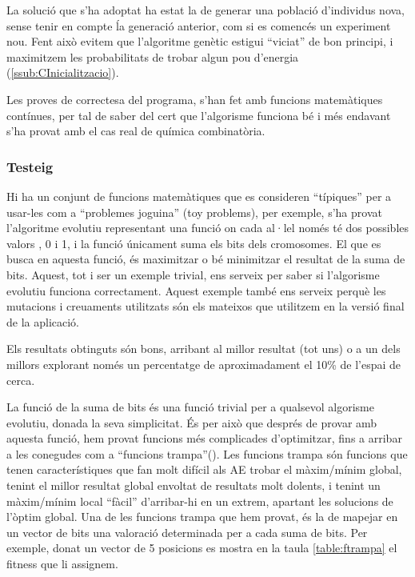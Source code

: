 La solució que s'ha adoptat ha estat la de generar una població d'individus
nova, sense tenir en compte ĺa generació anterior, com si es comencés un
experiment nou.  Fent això evitem que l'algoritme genètic estigui ``viciat'' de
bon principi, i maximitzem les probabilitats de trobar algun pou d'energia
(\ref{ssub:CInicialitzacio}).

Les proves de correctesa del programa, s'han fet amb funcions matemàtiques
contínues, per tal de saber del cert que l'algorisme funciona bé i més endavant
s'ha provat amb el cas real de química combinatòria.


\subsubsection{Testeig} %
\label{ssub:Testeig}

Hi ha un conjunt de funcions matemàtiques que es consideren ``típiques'' per a
usar-les com a ``problemes joguina'' (toy problems), per exemple, s'ha provat
l'algoritme evolutiu representant una funció on cada al·lel només té dos
possibles valors , 0 i 1, i la funció únicament suma els bits dels cromosomes.
El que es busca en aquesta funció, és maximitzar o bé minimitzar el resultat de
la suma de bits.  Aquest, tot i ser un exemple trivial, ens serveix per
saber si l'algorisme evolutiu funciona correctament.  Aquest exemple també ens
serveix perquè les mutacions i creuaments utilitzats són els mateixos que
utilitzem en la versió final de la aplicació.

Els resultats obtinguts són bons, arribant al millor resultat (tot uns) o a un
dels millors explorant només un percentatge de aproximadament el  10\% de
l'espai de cerca.

La funció de la suma de bits és una funció trivial per a qualsevol algorisme
evolutiu, donada la seva simplicitat.  És per això que després de provar amb
aquesta funció, hem provat funcions més complicades d'optimitzar, fins a arribar a
les conegudes com a ``funcions trampa''(\cite{EU2009}).  Les funcions trampa són funcions que
tenen característiques que fan molt difícil als AE trobar el màxim/mínim global,
tenint el millor resultat global envoltat de resultats molt dolents, i tenint un
màxim/mínim local ``fàcil'' d'arribar-hi en un extrem, apartant les solucions de
l'òptim global.  Una de les funcions trampa que hem provat, és la de mapejar en
un vector de bits una valoració determinada per a cada suma de bits.  Per
exemple, donat un vector de 5 posicions es mostra en la taula \ref{table:ftrampa}
el fitness que li assignem.

